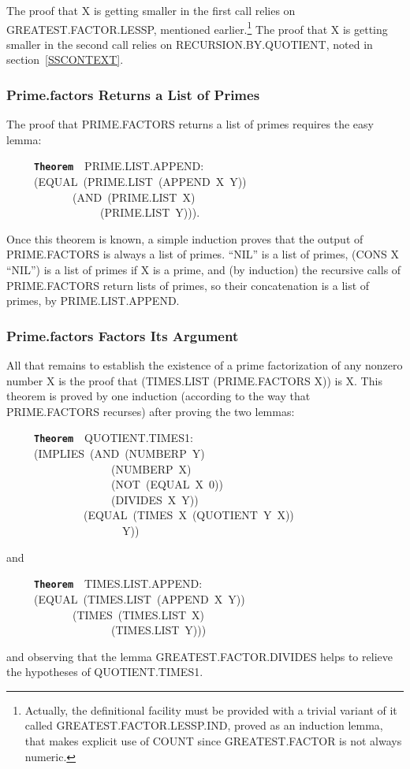 \documentclass[11pt]{book}
\newenvironment{pubasis}{\begin{flushleft}\ttfamily\small}{\normalsize\rmfamily\end{flushleft}}
\newcommand{\axiomordefinition}[1]{\vspace{6pt}\texttt{\textbf{#1}}}
\newcommand{\pubdefaulttextsize}{\large}
\begin{document}
The proof that X is getting smaller in the first call relies on
GREAT\-EST.FAC\-TOR.LESSP, mentioned earlier.\footnote{Actually, the definitional  facility must be provided with a trivial variant of it called GREAT\-EST.FAC\-TOR.LESSP.IND, proved as an induction lemma, that makes explicit use of COUNT since GREAT\-EST.FAC\-TOR is not always numeric.}  The proof that X is getting smaller in the second call
relies on RECURSION.BY.QUOTIENT, noted in section~\ref{SSCONTEXT}.
\subsubsection{Prime.factors Returns a List of Primes}
\pubdefaulttextsize
The proof that PRIME.FAC\-TORS returns a list of primes
requires the easy lemma:
\begin{pubasis}
~~~~~\axiomordefinition{Theorem}~~PRIME.LIST.APPEND:\\
~~~~~(EQUAL~(PRIME.LIST~(APPEND~X~Y))\\
~~~~~~~~~~~~(AND~(PRIME.LIST~X)\\
~~~~~~~~~~~~~~~~~(PRIME.LIST~Y))).\\
\end{pubasis}
Once this theorem is known, a simple induction
proves that the output
of PRIME.FAC\-TORS is always a list of primes. 
``NIL'' is a list of primes, (CONS X ``NIL'') is
a list of primes if X is a prime,  and (by induction) the
recursive calls of PRIME.FAC\-TORS return lists
of primes, so their concatenation is a list
of primes, by PRIME.LIST.APPEND.
\subsubsection{Prime.factors Factors Its Argument}
\pubdefaulttextsize
All that remains to establish the existence of a prime factorization
of any nonzero number X is
the proof that (TIMES.LIST (PRIME.FAC\-TORS X))
is X.  This theorem is proved by one induction
(according to the way that PRIME.FAC\-TORS recurses)
after  proving  the two lemmas:
\begin{pubasis}
~~~~~\axiomordefinition{Theorem}~~QUOTIENT.TIMES1:\\
~~~~~(IMPLIES~(AND~(NUMBERP~Y)\\
~~~~~~~~~~~~~~~~~~~(NUMBERP~X)\\
~~~~~~~~~~~~~~~~~~~(NOT~(EQUAL~X~0))\\
~~~~~~~~~~~~~~~~~~~(DIVIDES~X~Y))\\
~~~~~~~~~~~~~~(EQUAL~(TIMES~X~(QUOTIENT~Y~X))\\
~~~~~~~~~~~~~~~~~~~~~Y))\\
\end{pubasis}
and
\begin{pubasis}
~~~~~\axiomordefinition{Theorem}~~TIMES.LIST.APPEND:\\
~~~~~(EQUAL~(TIMES.LIST~(APPEND~X~Y))\\
~~~~~~~~~~~~(TIMES~(TIMES.LIST~X)\\
~~~~~~~~~~~~~~~~~~~(TIMES.LIST~Y)))\\
\end{pubasis}
and observing that the lemma GREAT\-EST.FAC\-TOR.DIVIDES
helps to relieve the hypotheses of QUOTIENT.TIMES1.
\end{document}
